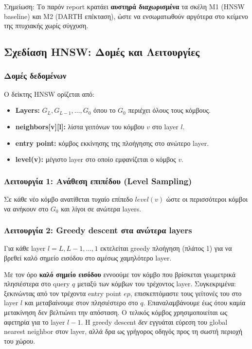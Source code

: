 \documentclass[12pt,a4paper]{article}
\begin{document}
Σημείωση: Το παρόν report κρατάει \textbf{αυστηρά διαχωρισμένα} τα σκέλη M1 (HNSW baseline) και M2 (DARTH επέκταση),
ώστε να ενσωματωθούν αργότερα στο κείμενο της πτυχιακής χωρίς σύγχυση.

\subsection{Σχεδίαση HNSW: Δομές και Λειτουργίες}
\label{subsec:hnsw_design}

\subsubsection{Δομές δεδομένων}
Ο δείκτης HNSW ορίζεται από:
\begin{itemize}
  \item \textbf{Layers:} $G_L, G_{L-1}, \dots, G_0$ όπου το $G_0$ περιέχει όλους τους κόμβους.
  \item \textbf{neighbors[v][l]:} λίστα γειτόνων του κόμβου $v$ στο layer $l$.
  \item \textbf{entry point:} κόμβος εκκίνησης της πλοήγησης στο ανώτερο layer.
  \item \textbf{level(v):} μέγιστο layer στο οποίο εμφανίζεται ο κόμβος $v$.
\end{itemize}

\subsubsection{Λειτουργία 1: Ανάθεση επιπέδου (Level Sampling)}
Σε κάθε νέο κόμβο ανατίθεται τυχαίο επίπεδο $level(v)$ ώστε οι περισσότεροι κόμβοι να ανήκουν στο $G_0$ και λίγοι σε ανώτερα layers.

\subsubsection{Λειτουργία 2: Greedy descent στα ανώτερα layers}
Για κάθε layer $l = L, L-1, \dots, 1$ εκτελείται greedy πλοήγηση (πλάτος 1) για να βρεθεί καλό σημείο εισόδου στο αμέσως χαμηλότερο layer.

Με τον όρο \textbf{καλό σημείο εισόδου} εννοούμε τον κόμβο που βρίσκεται γεωμετρικά πλησιέστερα στο query $q$ μεταξύ των κόμβων του τρέχοντος layer. Συγκεκριμένα: ξεκινώντας από τον τρέχοντα entry point $ep$, επισκεπτόμαστε τους γείτονές του στο layer $l$ και μεταβαίνουμε στον πλησιέστερο στο $q$. Επαναλαμβάνουμε έως ότου καμία μετακίνηση δεν βελτιώνει την απόσταση. Ο τελικός κόμβος χρησιμοποιείται ως αφετηρία για το layer $l-1$. Η greedy descent \emph{δεν} εγγυάται εύρεση του global nearest neighbor στον layer, αλλά δρα ως γρήγορος οδηγός προς τη σωστή περιοχή του χώρου.
\end{document}
